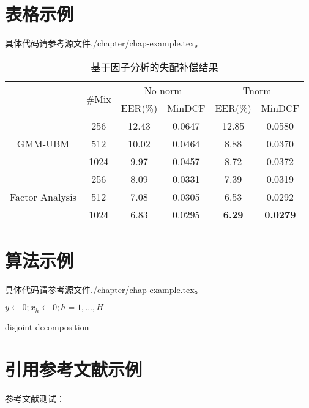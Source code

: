 \section{表格示例}
具体代码请参考源文件./chapter/chap-example.tex。
\begin{table}[htbp]
\centering
\caption{基于因子分析的失配补偿结果}
\label{tab:jfa-gmm-ubm}
\begin{tabular}{cccccc}
    \toprule
    &\multirow{2}{*}{\#Mix}&\multicolumn{2}{c}{No-norm}
    &\multicolumn{2}{c}{Tnorm}\\
    \cline{3-4} \cline{5-6}
		&		& EER(\%) 	& MinDCF & EER(\%) 	& MinDCF\\
    \midrule
	\multirow{3}{*}{GMM-UBM}
    &256 		& 12.43 	& 0.0647	& 12.85    & 0.0580\\
    &512 		& 10.02 	& 0.0464	& 8.88 	   & 0.0370\\
    &1024 		& 9.97 	    & 0.0457	& 8.72 	   & 0.0372\\
    \midrule
	\multirow{3}{*}{Factor Analysis}
    &256 		& 8.09 	& 0.0331 	& 7.39 	& 0.0319\\
    &512 		& 7.08 	& 0.0305 	& 6.53 	& 0.0292\\
    &1024 		& 6.83 	& 0.0295 	& \textbf{6.29} 	& \textbf{0.0279}\\
 \bottomrule
\end{tabular}
\end{table}

\section{算法示例}
具体代码请参考源文件./chapter/chap-example.tex。
\IncMargin{1em}
\begin{algorithm}
\BlankLine
\emph{$y\leftarrow 0;$$x_h\leftarrow 0;$$h=1,...,H$ }\;
\caption{disjoint decomposition}\label{algo_disjdecomp}
\end{algorithm}\DecMargin{1em}

\section{引用参考文献示例}
参考文献测试：\citep{deng:01a}